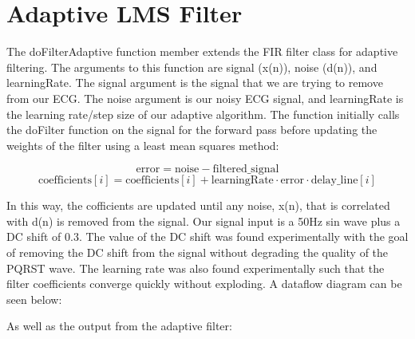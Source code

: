 \documentclass[8pt]{extarticle}
\begin{document}



\section{Adaptive LMS Filter}
The doFilterAdaptive function member extends the FIR filter class for adaptive filtering. The arguments to this function are signal (x(n)), noise (d(n)), and learningRate.
The signal argument is the signal that we are trying to remove from our ECG. The noise argument is our noisy ECG signal, and learningRate
 is the learning rate/step size of our adaptive algorithm. The function initially calls the doFilter function on the signal for
 the forward pass before updating the weights of the filter using a least mean squares method:

\begin{equation}
\text{error} = \text{noise} - \text{filtered\_signal}
\end{equation}
\begin{equation}
\text{coefficients}[i] = \text{coefficients}[i] + \text{learningRate} \cdot \text{error} \cdot \text{delay\_line}[i]
\end{equation}

In this way, the cofficients are updated until any noise, x(n), that is correlated with d(n) is removed from the signal.
Our signal input is a 50Hz sin wave plus a DC shift of 0.3. The value of the DC shift was found experimentally with the goal of 
removing the DC shift from the signal without degrading the quality of the PQRST wave. The learning rate was also found experimentally 
such that the filter coefficients converge quickly without exploding. A dataflow diagram can be seen below:



As well as the output from the adaptive filter:



\end{document}
